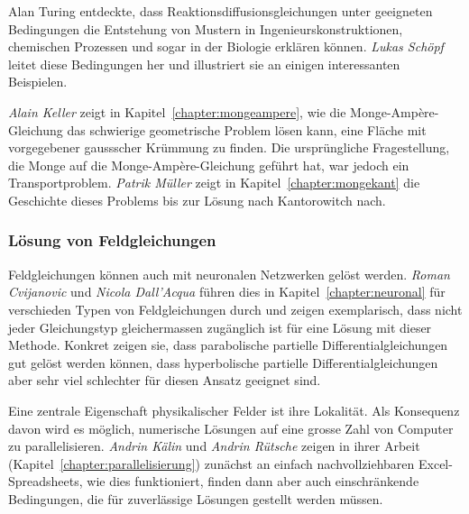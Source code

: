 %
%


%
%
Alan Turing
%
entdeckte, dass Reaktionsdiffusionsgleichungen unter geeigneten
Bedingungen die Entstehung von Mustern in Ingenieurskonstruktionen,
chemischen Prozessen und sogar in der Biologie erklären können.
\emph{Lukas Schöpf}
%
%
leitet diese Bedingungen her und illustriert sie an einigen interessanten
Beispielen.

%
%
\emph{Alain Keller}
%
%
zeigt in Kapitel~\ref{chapter:mongeampere}, wie die Monge-Ampère-Gleichung
%
das schwierige geometrische Problem lösen kann, eine Fläche mit vorgegebener
gaussscher Krümmung zu finden.
Die ursprüngliche Fragestellung, die Monge auf die Monge-Ampère-Gleichung
geführt hat, war jedoch ein Transportproblem.
%
\emph{Patrik Müller}
%
%
zeigt in Kapitel~\ref{chapter:mongekant} die Geschichte dieses Problems
bis zur Lösung nach Kantorowitch nach.
%

%
%
\subsubsection{Lösung von Feldgleichungen}

%
%
Feldgleichungen können auch mit neuronalen Netzwerken gelöst werden.
%
\emph{Roman Cvijanovic}
%
%
und
\emph{Nicola Dall'Acqua} 
%
%
führen dies in Kapitel~\ref{chapter:neuronal} für verschieden Typen
von Feldgleichungen durch und zeigen exemplarisch, dass nicht jeder
Gleichungstyp gleichermassen zugänglich ist für eine Lösung mit dieser
Methode. 
Konkret zeigen sie, dass parabolische partielle Differentialgleichungen
gut gelöst werden können, dass hyperbolische partielle Differentialgleichungen
aber sehr viel schlechter für diesen Ansatz geeignet sind.

%
%
Eine zentrale Eigenschaft physikalischer Felder ist ihre Lokalität.
%
Als Konsequenz davon wird es möglich, numerische Lösungen auf eine
grosse Zahl von Computer zu parallelisieren.
%
\emph{Andrin Kälin}
%
%
und
\emph{Andrin Rütsche}
%
%
zeigen in ihrer Arbeit (Kapitel~\ref{chapter:parallelisierung})
zunächst an einfach nachvollziehbaren Excel-Spreadsheets, wie dies
%
%
funktioniert, finden dann aber auch einschränkende Bedingungen,
die für zuverlässige Lösungen gestellt werden müssen.

